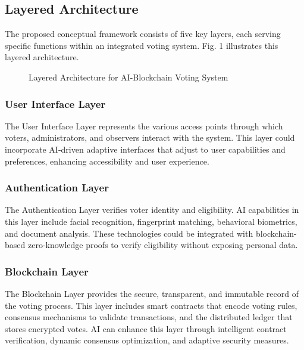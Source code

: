 \documentclass[conference]{IEEEtran}
\begin{document}
\subsection{Layered Architecture}
The proposed conceptual framework consists of five key layers, each serving specific functions within an integrated voting system. Fig. 1 illustrates this layered architecture.

\begin{figure}[!htb]
\centering
{}
\caption{Layered Architecture for AI-Blockchain Voting System}
\label{fig:architecture}
\end{figure}

\subsubsection{User Interface Layer}
The User Interface Layer represents the various access points through which voters, administrators, and observers interact with the system. This layer could incorporate AI-driven adaptive interfaces that adjust to user capabilities and preferences, enhancing accessibility and user experience.

\subsubsection{Authentication Layer}
The Authentication Layer verifies voter identity and eligibility. AI capabilities in this layer include facial recognition, fingerprint matching, behavioral biometrics, and document analysis. These technologies could be integrated with blockchain-based zero-knowledge proofs to verify eligibility without exposing personal data.

\subsubsection{Blockchain Layer}
The Blockchain Layer provides the secure, transparent, and immutable record of the voting process. This layer includes smart contracts that encode voting rules, consensus mechanisms to validate transactions, and the distributed ledger that stores encrypted votes. AI can enhance this layer through intelligent contract verification, dynamic consensus optimization, and adaptive security measures.
\end{document}
